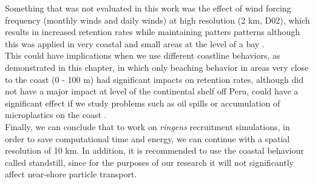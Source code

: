 Something that was not evaluated in this work was the effect of wind forcing frequency (monthly winds and daily winds) at high resolution (2 km, D02), which results in increased retention rates while maintaining patters patterns although this was applied in very coastal and small areas at the level of a bay \citep{FlorTam2019}.\\

This could have implications when we use different coastline behaviors, as demonstrated in this chapter, in which only beaching behavior in areas very close to the coast (0 - 100 m) had significant impacts on retention rates, although did not have a major impact at level of the continental shelf off Peru, could have a significant effect if we study problems such as oil spills or accumulation of microplastics on the coast \citep{AtwoFalc2019,LopeNajj2021}.\\

Finally, we can conclude that to work on \textit{\gls{ringens}} recruitment simulations, in order to save computational time and energy, we can continue with a spatial resolution of 10 km. In addition, it is recommended to use the coastal behaviour called standstill, since for the purposes of our research it will not significantly affect near-shore particle transport.\\

\clearpage